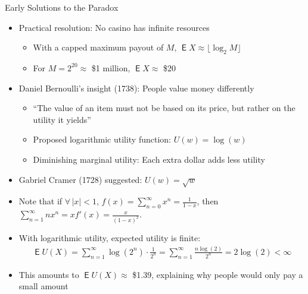 \documentclass[10pt,handout]{beamer}
\DeclareMathOperator\expc{\mathsf{E}}
\begin{document}
\begin{frame}{Early Solutions to the Paradox}
  \begin{itemize}[<+->]
    \item Practical resolution: No casino has infinite resources
      \begin{itemize}
        \item With a capped maximum payout of $M$, $\expc{X} \approx \lfloor \log_2 M \rfloor$
        \item For $M = 2^{20} \approx$ \$1 million, $\expc{X} \approx$ \$20
      \end{itemize}
    \item Daniel Bernoulli's insight (1738): People value money differently
      \begin{itemize}
        \item ``The value of an item must not be based on its price, but rather on the utility it yields''
        \item Proposed logarithmic utility function: $U(w) = \log(w)$
        \item Diminishing marginal utility: Each extra dollar adds less utility
      \end{itemize}
    \item Gabriel Cramer (1728) suggested: $U(w) = \sqrt{w}$ 
    \item Note that if $\forall\,|x| < 1$, $f(x) = \sum_{n=0}^\infty x^n = \frac{1}{1 - x}$, then $\sum_{n=1}^\infty nx^n = xf'(x) = \frac{x}{(1 - x)^2}$.
    \item With logarithmic utility, expected utility is finite:
      \begin{align*}
        \expc{U(X)} = \sum_{n=1}^{\infty} \log(2^n) \cdot \frac{1}{2^n} = \sum_{n=1}^{\infty} \frac{n \log(2)}{2^n} = 2\log(2) < \infty
      \end{align*}
    \item This amounts to $\expc{U(X)} \approx$ \$1.39, explaining why people would only pay a small amount
  \end{itemize}
\end{frame}
\end{document}
